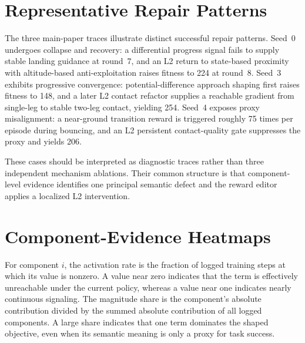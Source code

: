 \documentclass[conference]{IEEEtran}
\begin{document}
\begin{table}[t]
\caption{Independent-10. Columns denote unrelated initial candidates rather than revision rounds.}
\centering
\scriptsize
{}
\end{table}

\section{Representative Repair Patterns}
The three main-paper traces illustrate distinct successful repair patterns. Seed~0 undergoes collapse and recovery: a differential progress signal fails to supply stable landing guidance at round~7, and an L2 return to state-based proximity with altitude-based anti-exploitation raises fitness to 224 at round~8. Seed~3 exhibits progressive convergence: potential-difference approach shaping first raises fitness to 148, and a later L2 contact refactor supplies a reachable gradient from single-leg to stable two-leg contact, yielding 254. Seed~4 exposes proxy misalignment: a near-ground transition reward is triggered roughly 75 times per episode during bouncing, and an L2 persistent contact-quality gate suppresses the proxy and yields 206.

These cases should be interpreted as diagnostic traces rather than three independent mechanism ablations. Their common structure is that component-level evidence identifies one principal semantic defect and the reward editor applies a localized L2 intervention.

\section{Component-Evidence Heatmaps}
For component $i$, the activation rate is the fraction of logged training steps at which its value is nonzero. A value near zero indicates that the term is effectively unreachable under the current policy, whereas a value near one indicates nearly continuous signaling. The magnitude share is the component's absolute contribution divided by the summed absolute contribution of all logged components. A large share indicates that one term dominates the shaped objective, even when its semantic meaning is only a proxy for task success.
\end{document}
